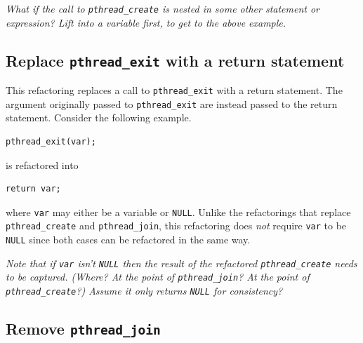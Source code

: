 \emph{What if the call to \lstinline|pthread_create| is nested in some other statement or expression? Lift into a variable first, to get to the above example.}

\subsection{Replace \lstinline|pthread_exit| with a return statement}

This refactoring replaces a call to \lstinline|pthread_exit| with a return statement. The argument originally passed to \lstinline|pthread_exit| are instead passed to the return statement. Consider the following example.

\begin{lstlisting}[frame=single]
pthread_exit(var);
\end{lstlisting}

\noindent
is refactored into

\begin{lstlisting}[frame=single]
return var;
\end{lstlisting}

\noindent
where \lstinline|var| may either be a variable or \lstinline|NULL|. Unlike the refactorings that replace \lstinline|pthread_create| and \lstinline|pthread_join|, this refactoring does \emph{not} require \lstinline|var| to be \lstinline|NULL| since both cases can be refactored in the same way.



\emph{Note that if \lstinline|var| \emph{isn't} \lstinline|NULL| then the result of the refactored \lstinline|pthread_create| needs to be captured. (Where? At the point of \lstinline|pthread_join|? At the point of \lstinline|pthread_create|?) Assume it only returns \lstinline|NULL| for consistency?}

\subsection{Remove \lstinline|pthread_join|}

